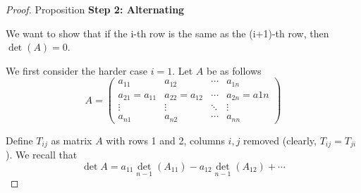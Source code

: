 \begin{proof} {Proposition}
    \textbf{Step 2: Alternating}

    We want to show that if the i-th row is the same as the (i+1)-th row, then \(\det(A) = 0\). 
    
    We first consider the harder case \(i=1\). Let \(A\) be as follows \[
        A = \begin{pmatrix}
            a_{11}          & a_{12}          & \cdots & a_{1n}         \\
            a_{21} = a_{11} & a_{22} = a_{12} & \cdots & a_{2n} = a{1n} \\
            \vdots          & \vdots          & \ddots & \vdots         \\
            a_{n1}          & a_{n2}          & \cdots & a_{nn}
        \end{pmatrix}
    \]

    Define \(T_{ij}\) as matrix \(A\) with rows 1 and 2, columns \(i, j\) removed (clearly, \(T_{ij} = T_{ji}\)). We recall that \[
        \det A = a_{11}\det_{n-1}(A_{11}) - a_{12}\det_{n-1}(A_{12}) + \cdots
    \]


\end{proof}
